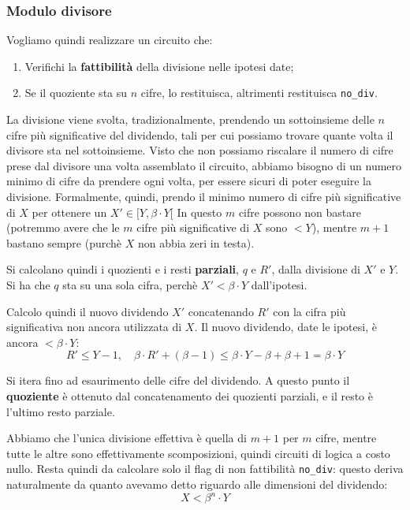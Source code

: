 \documentclass[a4paper,11pt]{article}
\begin{document}
\subsubsection{Modulo divisore}
Vogliamo quindi realizzare un circuito che:
\begin{enumerate}
	\item Verifichi la \textbf{fattibilità} della divisione nelle ipotesi date;
	\item Se il quoziente sta su $n$ cifre, lo restituisca, altrimenti restituisca \lstinline|no_div|.
\end{enumerate}

La divisione viene svolta, tradizionalmente, prendendo un sottoinsieme delle $n$ cifre più significative del dividendo, tali per cui possiamo trovare quante volta il divisore sta nel sottoinsieme.
Visto che non possiamo riscalare il numero di cifre prese dal divisore una volta assemblato il circuito, abbiamo bisogno di un numero minimo di cifre da prendere ogni volta, per essere sicuri di poter eseguire la divisione. 
Formalmente, quindi, prendo il minimo numero di cifre più significative di $X$ per ottenere un $X' \in [Y, \beta \cdot Y[$
In questo $m$ cifre possono non bastare (potremmo avere che le $m$ cifre più significative di $X$ sono $< Y$), mentre $m+1$ bastano sempre (purchè $X$ non abbia zeri in testa).

Si calcolano quindi i quozienti e i resti \textbf{parziali}, $q$ e $R'$, dalla divisione di $X'$ e $Y$.
Si ha che $q$ sta su una sola cifra, perchè $X' < \beta \cdot Y$ dall'ipotesi.

Calcolo quindi il nuovo dividendo $X'$ concatenando $R'$ con la cifra più significativa non ancora utilizzata di $X$.
Il nuovo dividendo, date le ipotesi, è ancora $< \beta \cdot Y$:
$$
R' \leq Y - 1, \quad \beta \cdot R' + (\beta - 1) \leq \beta \cdot  Y - \beta + \beta + 1 = \beta \cdot Y
$$

Si itera fino ad esaurimento delle cifre del dividendo.
A questo punto il \textbf{quoziente} è ottenuto dal concatenamento dei quozienti parziali, e il resto è l'ultimo resto parziale.

Abbiamo che l'unica divisione effettiva è quella di $m+1$ per $m$ cifre, mentre tutte le altre sono effettivamente scomposizioni, quindi circuiti di logica a costo nullo.
Resta quindi da calcolare solo il flag di non fattibilità \lstinline|no_div|: questo deriva naturalmente da quanto avevamo detto riguardo alle dimensioni del dividendo:
$$
X < \beta^n \cdot Y
$$
\end{document}
